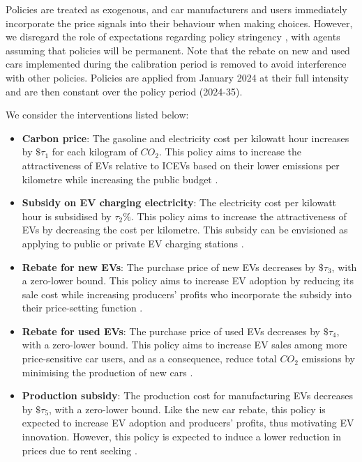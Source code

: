 \documentclass[12pt]{article}
\begin{document}
	Policies are treated as exogenous, and car manufacturers and users immediately incorporate the price signals into their behaviour when making choices. However, we disregard the role of expectations regarding policy stringency \citep{helm2003credible,aghion2019path}, with agents assuming that policies will be permanent. Note that the rebate on new and used cars implemented during the calibration period is removed to avoid interference with other policies. Policies are applied from January 2024 at their full intensity and are then constant over the policy period (2024-35).

	We consider the interventions listed below:

	\begin{itemize}
		\item \textbf{Carbon price}: The gasoline and electricity cost per kilowatt hour increases by $\$\tau_1$ for each kilogram of $CO_2$. This policy aims to increase the attractiveness of EVs relative to ICEVs based on their lower emissions per kilometre while increasing the public budget \citep{Hardman2019Understanding}.
		\item \textbf{Subsidy on EV charging electricity}: The electricity cost per kilowatt hour is subsidised by $\tau_2\%$. This policy aims to increase the attractiveness of EVs by decreasing the cost per kilometre. This subsidy can be envisioned as applying to public or private EV charging stations \citep{Kwon2018Evaluation}.
		\item \textbf{Rebate for new EVs}: The purchase price of new EVs decreases by $\$\tau_3$, with a zero-lower bound. This policy aims to increase EV adoption by reducing its sale cost while increasing producers' profits who incorporate the subsidy into their price-setting function \citep{Lodhia2024Assessment}.
		\item \textbf{Rebate for used EVs}: The purchase price of used EVs decreases by $\$\tau_4$, with a zero-lower bound. This policy aims to increase EV sales among more price-sensitive car users, and as a consequence, reduce total $CO_2$ emissions by minimising the production of new cars \citep{Lodhia2024Assessment}.
		\item \textbf{Production subsidy}: The production cost for manufacturing EVs decreases by $\$\tau_5$, with a zero-lower bound. Like the new car rebate, this policy is expected to increase EV adoption and producers' profits, thus motivating EV innovation. However, this policy is expected to induce a lower reduction in prices due to rent seeking \citep{OECD2025Subsidies}.
	\end{itemize}
\end{document}
